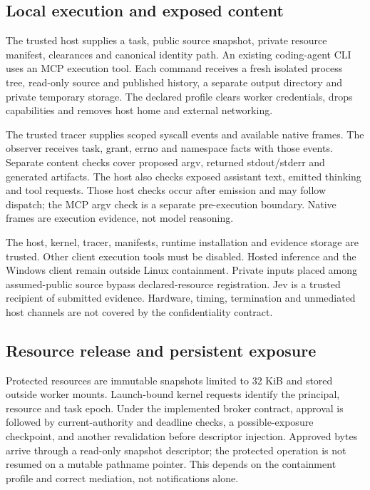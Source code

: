\documentclass[conference]{IEEEtran}
\begin{document}
\subsection{Local execution and exposed content}\label{local-execution-and-exposed-content}

The trusted host supplies a task, public source snapshot, private resource manifest, clearances and canonical identity path. An existing coding-agent CLI uses an MCP execution tool. Each command receives a fresh isolated process tree, read-only source and published history, a separate output directory and private temporary storage. The declared profile clears worker credentials, drops capabilities and removes host home and external networking.

The trusted tracer supplies scoped syscall events and available native frames. The observer receives task, grant, errno and namespace facts with those events. Separate content checks cover proposed argv, returned stdout/stderr and generated artifacts. The host also checks exposed assistant text, emitted thinking and tool requests. Those host checks occur after emission and may follow dispatch; the MCP argv check is a separate pre-execution boundary. Native frames are execution evidence, not model reasoning.

The host, kernel, tracer, manifests, runtime installation and evidence storage are trusted. Other client execution tools must be disabled. Hosted inference and the Windows client remain outside Linux containment. Private inputs placed among assumed-public source bypass declared-resource registration. Jev is a trusted recipient of submitted evidence. Hardware, timing, termination and unmediated host channels are not covered by the confidentiality contract.

\subsection{Resource release and persistent exposure}\label{resource-release-and-persistent-exposure}

Protected resources are immutable snapshots limited to 32 KiB and stored outside worker mounts. Launch-bound kernel requests identify the principal, resource and task epoch. Under the implemented broker contract, approval is followed by current-authority and deadline checks, a possible-exposure checkpoint, and another revalidation before descriptor injection. Approved bytes arrive through a read-only snapshot descriptor; the protected operation is not resumed on a mutable pathname pointer. This depends on the containment profile and correct mediation, not notifications alone.
\end{document}
